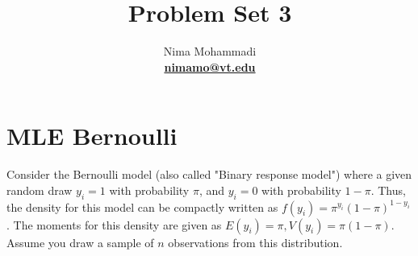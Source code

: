 \documentclass[11pt,reqno]{amsart}\usepackage[]{graphicx}\usepackage[]{color}
\newcommand{\ksp}{\vspace{0.1in}}   %
\newcommand{\kl}{\left(}
\newcommand{\kr}{\right)}
\begin{document}

\title{Problem Set 3}
\author{Nima Mohammadi \\ \href{mailto:nimamo@vt.edu}{\textbf{nimamo@vt.edu}}} %
\maketitle %











\section{MLE Bernoulli}
Consider the Bernoulli model (also called "Binary response model") where a given random draw $y_i = 1$ with probability $\pi$, 
and $y_i = 0$ with probability $1-\pi$.  
Thus, the density for this model can be compactly written as $f\kl y_i \kr =\pi^{y_i}\kl 1-\pi \kr^{1-y_i}$.  
The moments for this density are given as $E\kl y_i \kr = \pi, V\kl y_i \kr =\pi\kl 1-\pi \kr$. 
Assume you draw a sample of $n$ observations from this distribution.
\ksp
\end{document}
